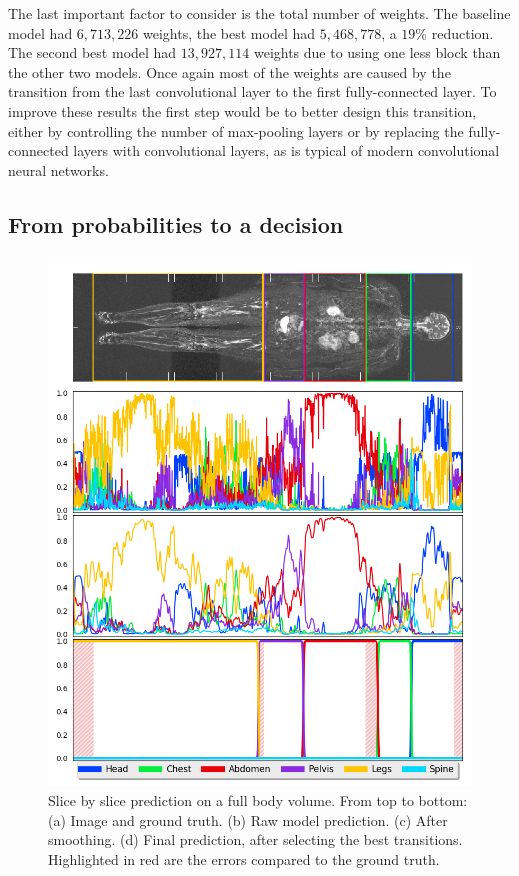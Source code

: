 The last important factor to consider is the total number of weights. The baseline model had $6,713,226$ weights, the best model had $5,468,778$, a $19 \%$ reduction. The second best model had $13,927,114$ weights due to using one less block than the other two models. Once again most of the weights are caused by the transition from the last convolutional layer to the first fully-connected layer. To improve these results the first step would be to better design this transition, either by controlling the number of max-pooling layers or by replacing the fully-connected layers with convolutional layers, as is typical of modern convolutional neural networks. 

\subsection{From probabilities to a decision}

\begin{figure}[htbp]
	\centering
	\includegraphics[width=\linewidth]{img_hyperopt/fullbody_error}
	\caption[Slice by slice prediction on a full body volume]{Slice by slice prediction on a full body volume. From top to bottom: (a) Image and ground truth. (b) Raw model prediction. (c) After smoothing. (d) Final prediction, after selecting the best transitions. Highlighted in red are the errors compared to the ground truth.}
	\label{fig:full_body}
\end{figure}

